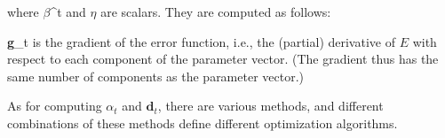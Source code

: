 where $\beta$^{t} and $\eta$ are scalars. They are computed as follows:

\textbf{g}_{t} is the gradient of the error function, i.e., the (partial) derivative of $E$ with respect to each component
of the parameter vector. (The gradient thus has the same number of components as the parameter vector.)


As for computing $\alpha_t$ and $\mathbf{d}_{t}$, there are various methods, and different combinations of these methods define different optimization algorithms. 








